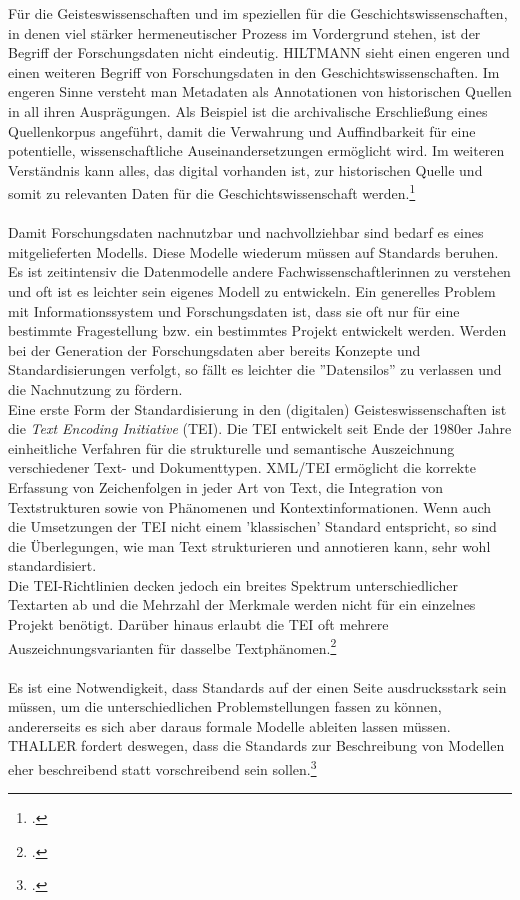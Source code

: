 \documentclass[12pt,a4paper]{article}
\begin{document}
Für die Geisteswissenschaften und im speziellen für die Geschichtswissenschaften, in denen viel stärker hermeneutischer Prozess im Vordergrund stehen, ist der Begriff der Forschungsdaten nicht eindeutig. HILTMANN sieht einen engeren und einen weiteren Begriff von Forschungsdaten in den Geschichtswissenschaften. Im engeren Sinne versteht man Metadaten als Annotationen von historischen Quellen in all ihren Ausprägungen. Als Beispiel ist die archivalische Erschließung eines Quellenkorpus angeführt, damit die Verwahrung und Auffindbarkeit für eine potentielle, wissenschaftliche Auseinandersetzungen ermöglicht wird. Im weiteren Verständnis kann alles, das digital vorhanden ist, zur historischen Quelle und somit zu relevanten Daten für die Geschichtswissenschaft werden.\footcite[][09.06.2019.]{hiltman2018forschungsdaten}
\\
\\
Damit Forschungsdaten nachnutzbar und nachvollziehbar sind bedarf es eines mitgelieferten Modells. Diese Modelle wiederum müssen auf Standards beruhen. Es ist zeitintensiv die Datenmodelle andere Fachwissenschaftlerinnen zu verstehen und oft ist es leichter sein eigenes Modell zu entwickeln. Ein generelles Problem mit Informationssystem und Forschungsdaten ist, dass sie oft nur für eine bestimmte Fragestellung bzw. ein bestimmtes Projekt entwickelt werden. Werden bei der Generation der Forschungsdaten aber bereits Konzepte und Standardisierungen verfolgt, so fällt es leichter die ''Datensilos'' zu verlassen und die Nachnutzung zu fördern. 
\\
Eine erste Form der Standardisierung in den (digitalen) Geisteswissenschaften ist die \textit{Text Encoding Initiative} (TEI). Die TEI entwickelt seit Ende der 1980er Jahre einheitliche Verfahren für die strukturelle und semantische Auszeichnung verschiedener Text- und Dokumenttypen. XML/TEI ermöglicht die korrekte Erfassung von Zeichenfolgen in jeder Art von Text, die Integration von Textstrukturen sowie von Phänomenen und Kontextinformationen. Wenn auch die Umsetzungen der TEI nicht einem 'klassischen' Standard entspricht, so sind die Überlegungen, wie man Text strukturieren und annotieren kann, sehr wohl standardisiert.
\\
Die TEI-Richtlinien decken jedoch ein breites Spektrum unterschiedlicher Textarten ab und die Mehrzahl der Merkmale werden nicht für ein einzelnes Projekt benötigt. Darüber hinaus erlaubt die TEI oft mehrere Auszeichnungsvarianten für dasselbe Textphänomen.\footcite[][S.234-249]{sahle2017dhedition}  
\\
\\
Es ist eine Notwendigkeit, dass Standards auf der einen Seite ausdrucksstark sein müssen, um die unterschiedlichen Problemstellungen fassen zu können, andererseits es sich aber daraus formale Modelle ableiten lassen müssen. THALLER fordert deswegen, dass die Standards zur Beschreibung von Modellen eher beschreibend statt vorschreibend sein sollen.\footcite[][S.204]{thaller2017need}
\end{document}
